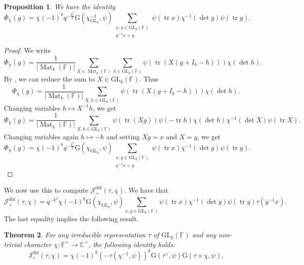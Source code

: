 \documentclass[12pt, reqno]{amsart}
\newtheorem{theorem}{Theorem}[section]
\newtheorem{proposition}[theorem]{Proposition}
\theoremstyle{definition}
\theoremstyle{definition}
\theoremstyle{definition}
\newcommand{\cComplex}{\mathbb{C}}
\newcommand{\multiplicativegroup}[1]{#1^{\times}}
\newcommand{\sizeof}[1]{\left|#1\right|}
\newcommand{\fieldCharacter}{\psi}
\newcommand{\IdentityMatrix}[1]{I_{#1}}
\newcommand{\trace}{\operatorname{tr}}
\newcommand{\GL}{\mathrm{GL}}
\newcommand{\finiteField}{\mathbb{F}}
\newcommand{\squareMatrix}{\operatorname{Mat}}
\newcommand{\GaussSumSingleCharacter}[2]{\tau\left(#1, #2\right)}
\newcommand{\posDblJacobiSum}[2]{\mathcal{J}_{+}^{\mathrm{dbl}}\left(#1, #2\right)}
\newcommand{\GaussSumScalar}[2]{\mathrm{G}\left(#1, #2\right)}
\newcommand{\posDblJacobiSumScalar}[2]{\mathrm{J}_{+}^{\mathrm{dbl}}\left(#1, #2\right)}
\begin{document}
\begin{proposition}\label{prop:doubling-for-gln-in-terms-of-kondo}
	We have the identity
	$$\Phi_{\chi}\left(g\right) = \chi\left(-1\right)^k q^{-\frac{k^2}{2}} \GaussSumScalar{\chi^{-1}_{\GL_k}}{\fieldCharacter} \sum_{\substack{x, y \in \GL_k\left(\finiteField\right)\\
			y^{-1} x = g}} \fieldCharacter\left(\trace x\right) \chi^{-1}\left(\det y\right) \fieldCharacter\left(\trace y\right).$$
\end{proposition}
\begin{proof}
	We write $$\Phi_{\chi}\left(g\right) = \frac{1}{\sizeof{\squareMatrix_k\left(\finiteField\right)}}\sum_{X \in \squareMatrix_k\left(\finiteField\right)} \sum_{h \in \GL_k\left(\finiteField\right)} \fieldCharacter\left(\trace \left(X\left(g+\IdentityMatrix{k}-h\right)\right)\right) \chi\left(\det h\right).$$
	By , we can reduce the sum to $X \in \GL_k\left(\finiteField\right)$. Thus	$$\Phi_{\chi}\left(g\right) = \frac{1}{\sizeof{\squareMatrix_k\left(\finiteField\right)}} \sum_{X, h \in \GL_k\left(\finiteField\right)} \fieldCharacter\left(\trace \left(X\left(g+\IdentityMatrix{k}-h\right)\right)\right) \chi\left(\det h\right).$$
	Changing variables $h \mapsto X^{-1} h$, we get
	$$\Phi_{\chi}\left(g\right) = \frac{1}{\sizeof{\squareMatrix_k\left(\finiteField\right)}} \sum_{X, h \in \GL_k\left(\finiteField\right)} \fieldCharacter\left(\trace \left(Xg\right)\right) \fieldCharacter\left(-\trace h\right) \chi\left(\det h\right) \chi^{-1}\left(\det X\right) \fieldCharacter\left(\trace X\right).$$
	Changing variables again $h \mapsto -h$ and setting $Xg = x$ and $X = y$, we get  
	$$\Phi_{\chi}\left(g\right) = \chi\left(-1\right)^k q^{-\frac{k^2}{2}} \GaussSumScalar{\chi_{\GL_k}}{\fieldCharacter} \sum_{\substack{x, y \in \GL_k\left(\finiteField\right)\\
			y^{-1} x = g}} \fieldCharacter\left(\trace x\right) \chi^{-1}\left(\det y\right) \fieldCharacter\left(\trace y\right).$$
\end{proof}

We now use this to compute $\posDblJacobiSum{\tau}{\chi}$. We have that $$\posDblJacobiSum{\tau}{\chi} = q^{-k^2} \chi\left(-1\right)^k \GaussSumScalar{\chi_{\GL_k}}{\fieldCharacter} \sum_{x, y \in \GL_k\left(\finiteField\right)} \fieldCharacter\left(\trace x\right) \chi^{-1}\left(\det y\right) \fieldCharacter\left(\trace y\right) \tau\left(y^{-1} x\right).$$
The last equality implies the following result.
\begin{theorem}\label{thm:gln-doubling-gauss-sum-in-terms-of-kondo}For any irreducible representation $\tau$ of $\GL_k\left(\finiteField\right)$ and any non-trivial character $\chi \colon \multiplicativegroup{\finiteField} \to \multiplicativegroup{\cComplex}$, the following identity holds:
	$$\posDblJacobiSumScalar{\tau}{\chi} = \chi\left(-1\right)^k \left(-\GaussSumSingleCharacter{\chi^{-1}}{\fieldCharacter}\right)^k \GaussSumScalar{\tau^{\vee}}{\fieldCharacter} \GaussSumScalar{\tau \times \chi}{\fieldCharacter}.$$
\end{theorem}
\end{document}
